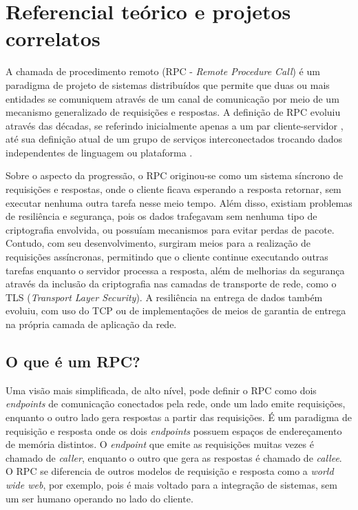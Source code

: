 \chapter{Referencial teórico e projetos correlatos}

A chamada de procedimento remoto (RPC - \textit{Remote Procedure Call}) é um paradigma de projeto de sistemas distribuídos que permite que duas ou mais entidades se comuniquem através de um canal de comunicação por meio de um mecanismo generalizado de requisições e respostas. A definição de RPC evoluiu através das décadas, se referindo inicialmente apenas a um par cliente-servidor \cite{nelson_remote_1981}, até sua definição atual de um grupo de serviços interconectados trocando dados independentes de linguagem ou plataforma \cite{slee_thrift_nodate}. 

Sobre o aspecto da progressão, o RPC originou-se como um sistema síncrono de requisições e respostas, onde o cliente ficava esperando a resposta retornar, sem executar nenhuma outra tarefa nesse meio tempo. Além disso, existiam problemas de resiliência e segurança, pois os dados trafegavam sem nenhuma tipo de criptografia envolvida, ou possuíam mecanismos para evitar perdas de pacote. Contudo, com seu desenvolvimento, surgiram meios para a realização de requisições assíncronas, permitindo que o cliente continue executando outras tarefas enquanto o servidor processa a resposta, além de melhorias da segurança através da inclusão da criptografia nas camadas de transporte de rede, como o TLS (\textit{Transport Layer Security}). A resiliência na entrega de dados também evoluiu, com uso do TCP ou de implementações de meios de garantia de entrega na própria camada de aplicação da rede.

\section{O que é um RPC?}

Uma visão mais simplificada, de alto nível, pode definir o RPC como dois \textit{endpoints} de comunicação conectados pela rede, onde um lado emite requisições, enquanto o outro lado gera respostas a partir das requisições. É um paradigma de requisição e resposta onde os dois \textit{endpoints} possuem espaços de endereçamento de memória distintos. O \textit{endpoint} que emite as requisições muitas vezes é chamado de \textit{caller}, enquanto o outro que gera as respostas é chamado de \textit{callee}. O RPC se diferencia de outros modelos de requisição e resposta como a \textit{world wide web}, por exemplo, pois é mais voltado para a integração de sistemas, sem um ser humano operando no lado do cliente.

